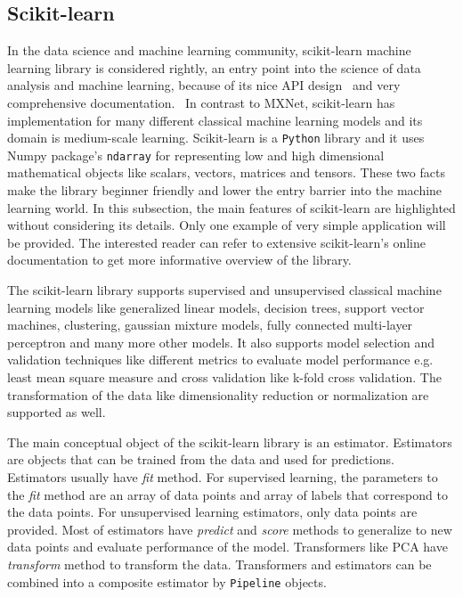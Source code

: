 \documentclass[english, 12pt, a4paper, elec, utf8, online]{aaltothesis}
\begin{document}
\subsection{Scikit-learn}
In the data science and machine learning community, scikit-learn machine learning library is considered rightly, an entry point into the science of data analysis and machine learning, because of its nice API design~\cite{buitinck2013api} and very comprehensive documentation.~\cite{pedregosa2011scikit} In contrast to MXNet, scikit-learn has implementation for many different classical machine learning models and its domain is medium-scale learning. Scikit-learn is a \texttt{Python} library and it uses Numpy package's \texttt{ndarray} for representing low and high dimensional mathematical objects like scalars, vectors, matrices and tensors. These two facts make the library beginner friendly and lower the entry barrier into the machine learning world. 
In this subsection, the main features of scikit-learn are highlighted without considering its details. 
Only one example of very simple application will be provided. The interested reader can refer to extensive scikit-learn's online documentation to get more informative overview of the library.

The scikit-learn library supports supervised and unsupervised classical machine learning models like generalized linear models, decision trees, support vector machines, clustering, gaussian mixture models, fully connected multi-layer perceptron and many more other models. It also supports model selection and validation techniques like different metrics to evaluate model performance e.g. least mean square measure and cross validation like k-fold cross validation. The transformation of the data like dimensionality reduction or normalization are supported as well.

The main conceptual object of the scikit-learn library is an estimator. Estimators are objects that can be trained from the data and used for predictions. Estimators usually have \textit{fit} method. For supervised learning, the parameters to the \textit{fit} method are an array of data points and array of labels that correspond to the data points. For unsupervised learning estimators, only data points are provided. Most of estimators have \textit{predict} and \textit{score} methods to generalize to new data points and evaluate performance of the model. Transformers like PCA have \textit{transform} method to transform the data. Transformers and estimators can be combined into a composite estimator by \texttt{Pipeline} objects.
\end{document}

